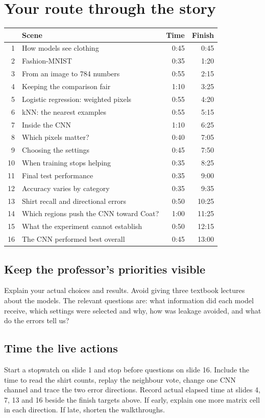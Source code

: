 \documentclass[11pt,a4paper]{article}
\newcounter{question}
\begin{document}
\clearpage\section{Your route through the story}
\begin{tabularx}{\linewidth}{rXrr}
\toprule
 & Scene & Time & Finish\\\midrule
1 & How models see clothing & 0:45 & 0:45\\
2 & Fashion-MNIST & 0:35 & 1:20\\
3 & From an image to 784 numbers & 0:55 & 2:15\\
4 & Keeping the comparison fair & 1:10 & 3:25\\
5 & Logistic regression: weighted pixels & 0:55 & 4:20\\
6 & kNN: the nearest examples & 0:55 & 5:15\\
7 & Inside the CNN & 1:10 & 6:25\\
8 & Which pixels matter? & 0:40 & 7:05\\
9 & Choosing the settings & 0:45 & 7:50\\
10 & When training stops helping & 0:35 & 8:25\\
11 & Final test performance & 0:35 & 9:00\\
12 & Accuracy varies by category & 0:35 & 9:35\\
13 & Shirt recall and directional errors & 0:50 & 10:25\\
14 & Which regions push the CNN toward Coat? & 1:00 & 11:25\\
15 & What the experiment cannot establish & 0:50 & 12:15\\
16 & The CNN performed best overall & 0:45 & 13:00\\\bottomrule
\end{tabularx}
\subsection{Keep the professor's priorities visible}
Explain your actual choices and results. Avoid giving three textbook lectures about the models. The relevant questions are: what information did each model receive, which settings were selected and why, how was leakage avoided, and what do the errors tell us?
\subsection{Time the live actions}
Start a stopwatch on slide 1 and stop before questions on slide 16. Include the time to read the shirt counts, replay the neighbour vote, change one CNN channel and trace the two error directions. Record actual elapsed time at slides 4, 7, 13 and 16 beside the finish targets above. If early, explain one more matrix cell in each direction. If late, shorten the walkthroughs.
\end{document}

